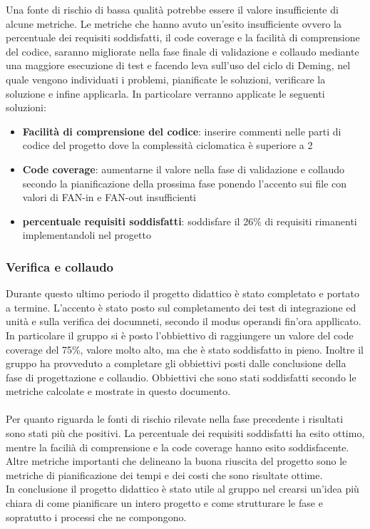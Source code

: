 Una fonte di rischio di bassa qualità potrebbe essere il valore insufficiente di alcune metriche. Le metriche che hanno avuto un'esito insufficiente ovvero la percentuale dei requisiti soddisfatti, il code coverage e la facilità di comprensione del codice, saranno migliorate
nella fase finale di validazione e collaudo mediante una maggiore esecuzione di test e facendo leva sull'uso del ciclo di Deming, nel quale
vengono individuati i problemi, pianificate le soluzioni, verificare la soluzione e infine applicarla.
In particolare  verranno applicate le seguenti soluzioni:

\newpage
\begin{itemize}
    \item \textbf{Facilità di comprensione del codice}: inserire commenti nelle parti di codice del progetto dove la complessità ciclomatica è superiore a 2
    \item \textbf{Code coverage}: aumentarne il valore nella fase di validazione e collaudo secondo la pianificazione della prossima fase  ponendo l'accento sui file con valori di FAN-in e FAN-out insufficienti
    \item \textbf{percentuale requisiti soddisfatti}: soddisfare il 26\% di requisiti rimanenti implementandoli nel progetto
\end{itemize} 

\subsubsection{Verifica e collaudo}

Durante questo ultimo periodo il progetto didattico è stato completato e portato a termine.
L'accento è stato posto sul completamento dei test di integrazione ed unità e sulla  verifica dei documneti, secondo il modus operandi fin'ora appllicato.
In particolare il gruppo si è posto l'obbiettivo di raggiungere un valore del code coverage del 75\%, valore molto alto, ma che è stato soddisfatto in pieno.
Inoltre il gruppo ha provveduto a completare gli obbiettivi posti dalle conclusione della fase di progettazione e collaudio.
Obbiettivi che sono stati soddisfatti secondo le metriche calcolate e mostrate in questo documento.\\
 \\
Per quanto riguarda le fonti di rischio rilevate nella fase precedente i risultati sono stati più che positivi.
La percentuale dei requisiti soddisfatti ha esito ottimo, mentre la facilià di comprensione e la code coverage hanno esito soddisfacente.
 Altre metriche importanti che delineano la buona riuscita del progetto sono le metriche di pianificazione dei tempi e dei costi che sono risultate ottime.\\
 In conclusione il progetto didattico è stato utile al gruppo nel crearsi un'idea più chiara di come pianificare un intero progetto e come strutturare le fase e sopratutto i processi che ne compongono.
 